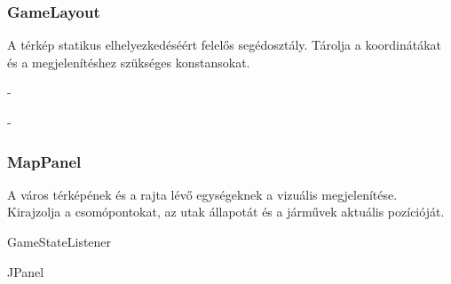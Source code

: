 \subsubsection{GameLayout}
\begin{class-template-responsibility}
    A térkép statikus elhelyezkedéséért felelős segédosztály. Tárolja a koordinátákat és a megjelenítéshez szükséges konstansokat.
\end{class-template-responsibility}
\begin{class-template-interface}
    -
\end{class-template-interface}
\begin{class-template-baseclass}
    -
\end{class-template-baseclass}
\begin{class-template-attribute}
\end{class-template-attribute}
\begin{class-template-method}
\end{class-template-method}

\subsubsection{MapPanel}
\begin{class-template-responsibility}
    A város térképének és a rajta lévő egységeknek a vizuális megjelenítése. Kirajzolja a csomópontokat, az utak állapotát és a járművek aktuális pozícióját.
\end{class-template-responsibility}
\begin{class-template-interface}
    GameStateListener
\end{class-template-interface}
\begin{class-template-baseclass}
    JPanel
\end{class-template-baseclass}
\begin{class-template-attribute}
\end{class-template-attribute}
\begin{class-template-method}
\end{class-template-method}

